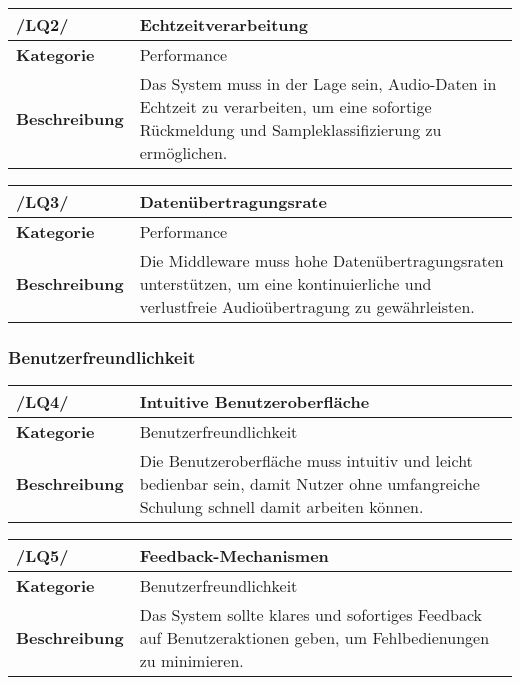 \begin{table}[h!]
	\begin{tabularx}{\textwidth}{|l|X|}
		\hline
		\textbf{/LQ2/} & \textbf{Echtzeitverarbeitung} \\ \hline
		\textbf{Kategorie} & Performance \\ \hline
		\textbf{Beschreibung} & Das System muss in der Lage sein, Audio-Daten in Echtzeit zu verarbeiten, um eine sofortige Rückmeldung und Sampleklassifizierung zu ermöglichen. \\ \hline
	\end{tabularx}
\end{table}

\begin{table}[h!]
	\begin{tabularx}{\textwidth}{|l|X|}
		\hline
		\textbf{/LQ3/} & \textbf{Datenübertragungsrate} \\ \hline
		\textbf{Kategorie} & Performance \\ \hline
		\textbf{Beschreibung} & Die Middleware muss hohe Datenübertragungsraten unterstützen, um eine kontinuierliche und verlustfreie Audioübertragung zu gewährleisten. \\ \hline
	\end{tabularx}
\end{table}

\subsubsection{Benutzerfreundlichkeit}

\begin{table}[h!]
	\begin{tabularx}{\textwidth}{|l|X|}
		\hline
		\textbf{/LQ4/} & \textbf{Intuitive Benutzeroberfläche} \\ \hline
		\textbf{Kategorie} & Benutzerfreundlichkeit \\ \hline
		\textbf{Beschreibung} & Die Benutzeroberfläche muss intuitiv und leicht bedienbar sein, damit Nutzer ohne umfangreiche Schulung schnell damit arbeiten können. \\ \hline
	\end{tabularx}
\end{table}

\begin{table}[h!]
	\begin{tabularx}{\textwidth}{|l|X|}
		\hline
		\textbf{/LQ5/} & \textbf{Feedback-Mechanismen} \\ \hline
		\textbf{Kategorie} & Benutzerfreundlichkeit \\ \hline
		\textbf{Beschreibung} & Das System sollte klares und sofortiges Feedback auf Benutzeraktionen geben, um Fehlbedienungen zu minimieren. \\ \hline
	\end{tabularx}
\end{table}

